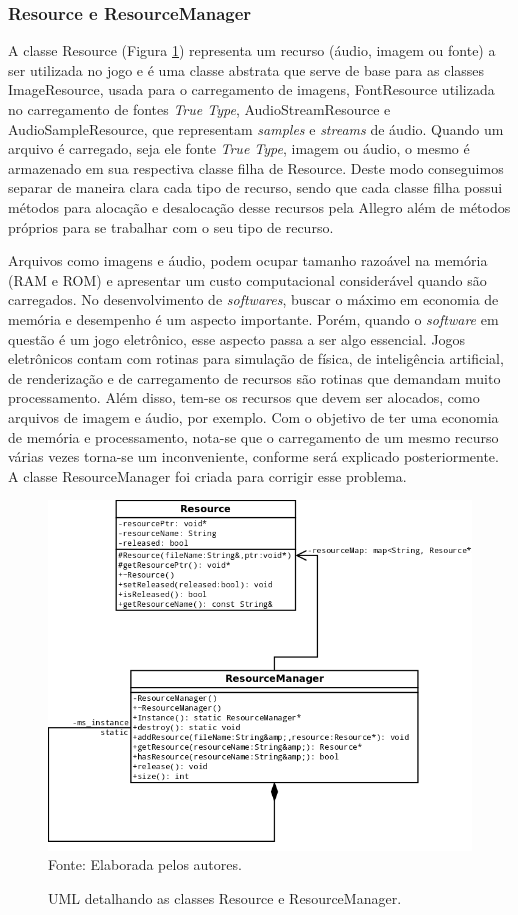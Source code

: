 \subsubsection{Resource e ResourceManager}
%
A classe Resource (Figura \ref{ResourceManager}) representa um recurso (áudio, imagem ou fonte) a ser utilizada no jogo e é uma classe abstrata que serve de base para as classes ImageResource, usada para o carregamento de imagens, FontResource utilizada no carregamento de fontes \textit{True Type}, AudioStreamResource e AudioSampleResource, que representam \textit{samples} e \textit{streams} de áudio. Quando um arquivo é carregado, seja ele fonte \textit{True Type}, imagem ou áudio, o mesmo é armazenado em sua respectiva classe filha de Resource. Deste modo conseguimos separar de maneira clara cada tipo de recurso, sendo que cada classe filha possui métodos para alocação e desalocação desse recursos pela Allegro além de métodos próprios para se trabalhar com o seu tipo de recurso. 
%
\par
Arquivos como imagens e áudio, podem ocupar tamanho razoável na memória (RAM e ROM) e apresentar um custo computacional considerável quando são carregados. No desenvolvimento de \textit{softwares}, buscar o máximo em economia de memória e desempenho é um aspecto importante. Porém, quando o \textit{software} em questão é um jogo eletrônico, esse aspecto passa a ser algo essencial. Jogos eletrônicos contam com rotinas para simulação de física, de inteligência artificial, de renderização e de carregamento de recursos são rotinas que demandam muito processamento. Além disso, tem-se os recursos que devem ser alocados, como arquivos de imagem e áudio, por exemplo. Com o objetivo de ter uma economia de memória e processamento, nota-se que o carregamento de um mesmo recurso várias vezes torna-se um inconveniente, conforme será explicado posteriormente. A classe ResourceManager foi criada para corrigir esse problema.
%
%
\begin{figure}[h]
    \centering
    \caption{UML detalhando as classes Resource e ResourceManager.}
    \label{ResourceManager}
    \includegraphics[scale = 0.4]{uml/ResourceManager.png}
    \\Fonte: Elaborada pelos autores.
\end{figure}

